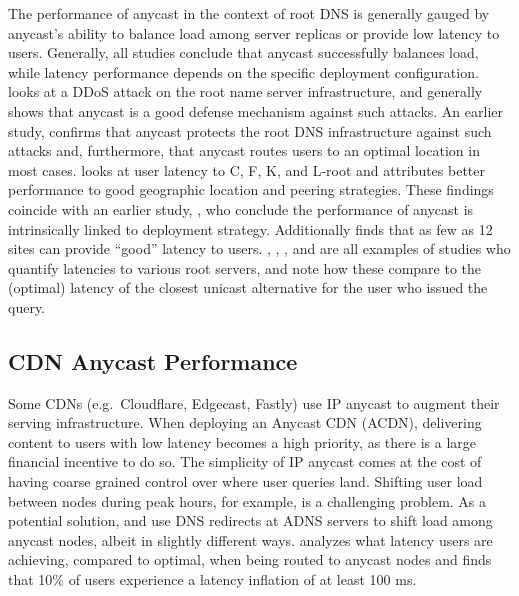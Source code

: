 \documentclass[sigconf,letterpaper,nonacm,10pt]{acmart}
\begin{document}
The performance of anycast in the context of root DNS is generally
gauged by anycast's ability to balance load among server replicas or
provide low latency to users. Generally, all studies conclude that
anycast successfully balances load, while latency performance depends on
the specific deployment configuration. \cite{moura2016anycast} looks at
a DDoS attack on the root name server infrastructure, and generally
shows that anycast is a good defense mechanism against such attacks. An
earlier study, \cite{sarat2006use} confirms that anycast protects the
root DNS infrastructure against such attacks and, furthermore, that
anycast routes users to an optimal location in most cases.
\cite{de2017anycast} looks at user latency to C, F, K, and L-root and
attributes better performance to good geographic location and peering
strategies. These findings coincide with an earlier study,
\cite{ballani2006measurement}, who conclude the performance of anycast
is intrinsically linked to deployment strategy. Additionally
\cite{de2017anycast} finds that as few as 12 sites can provide ``good''
latency to users. \cite{li_levin_spring_bhattacharjee_2018},
\cite{colitti2006evaluating}, \cite{de2017anycast}, and
\cite{liang2013measuring} are all examples of studies who quantify
latencies to various root servers, and note how these compare to the
(optimal) latency of the closest unicast alternative for the user who
issued the query.

\hypertarget{cdn-anycast-performance}{%
\subsection{CDN Anycast Performance}\label{cdn-anycast-performance}}

Some CDNs (e.g.~Cloudflare, Edgecast, Fastly) use IP anycast to augment
their serving infrastructure. When deploying an Anycast CDN (ACDN),
delivering content to users with low latency becomes a high priority, as
there is a large financial incentive to do so. The simplicity of IP
anycast comes at the cost of having coarse grained control over where
user queries land. Shifting user load between nodes during peak hours,
for example, is a challenging problem. As a potential solution,
\cite{alzoubi2011practical} and \cite{flavel2015fastroute} use DNS
redirects at ADNS servers to shift load among anycast nodes, albeit in
slightly different ways. \cite{calder2015analyzing} analyzes what
latency users are achieving, compared to optimal, when being routed to
anycast nodes and finds that 10\% of users experience a latency
inflation of at least 100 ms.
\end{document}
